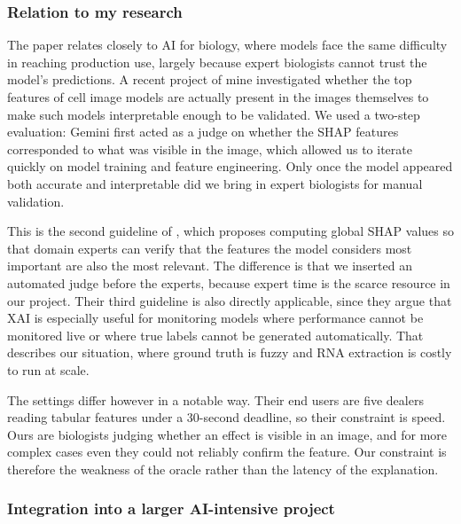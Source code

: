 \documentclass{article}
\begin{document}
\subsubsection*{Relation to my research}

The paper relates closely to AI for biology, where models face the same difficulty in reaching production use, largely because expert biologists cannot trust the model's predictions. A recent project of mine investigated whether the top features of cell image models are actually present in the images themselves to make such models interpretable enough to be validated. We used a two-step evaluation: Gemini first acted as a judge on whether the SHAP features corresponded to what was visible in the image, which allowed us to iterate quickly on model training and feature engineering. Only once the model appeared both accurate and interpretable did we bring in expert biologists for manual validation.

This is the second guideline of \citet{mikkelsen2025xai}, which proposes computing global SHAP values so that domain experts can verify that the features the model considers most important are also the most relevant. The difference is that we inserted an automated judge before the experts, because expert time is the scarce resource in our project. Their third guideline is also directly applicable, since they argue that XAI is especially useful for monitoring models where performance cannot be monitored live or where true labels cannot be generated automatically. That describes our situation, where ground truth is fuzzy and RNA extraction is costly to run at scale.

The settings differ however in a notable way. Their end users are five dealers reading tabular features under a 30-second deadline, so their constraint is speed. Ours are biologists judging whether an effect is visible in an image, and for more complex cases even they could not reliably confirm the feature. Our constraint is therefore the weakness of the oracle rather than the latency of the explanation.

\subsubsection*{Integration into a larger AI-intensive project}
\end{document}
